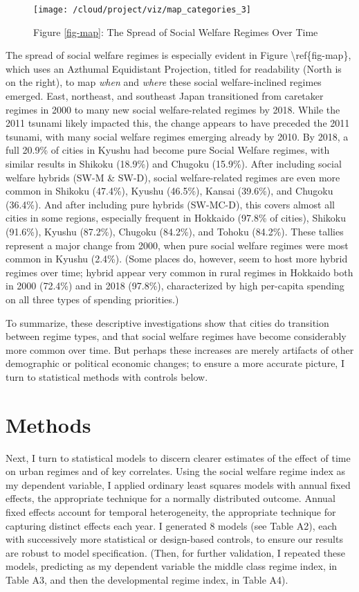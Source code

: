 \documentclass[preprint, 3p,
authoryear]{elsarticle} %
\begin{document}
\begin{figure}
\texttt{[image: /cloud/project/viz/map\_categories\_3]} \caption{Figure \ref{fig-map}\label{fig-map}: The Spread of Social Welfare Regimes Over Time}\label{fig:map}
\end{figure}

The spread of social welfare regimes is especially evident in Figure
\textbackslash ref\{fig-map\}, which uses an Azthumal Equidistant
Projection, titled for readability (North is on the right), to map
\emph{when} and \emph{where} these social welfare-inclined regimes
emerged. East, northeast, and southeast Japan transitioned from
caretaker regimes in 2000 to many new social welfare-related regimes by
2018. While the 2011 tsunami likely impacted this, the change appears to
have preceded the 2011 tsunami, with many social welfare regimes
emerging already by 2010. By 2018, a full 20.9\% of cities in Kyushu had
become pure Social Welfare regimes, with similar results in Shikoku
(18.9\%) and Chugoku (15.9\%). After including social welfare hybrids
(SW-M \& SW-D), social welfare-related regimes are even more common in
Shikoku (47.4\%), Kyushu (46.5\%), Kansai (39.6\%), and Chugoku
(36.4\%). And after including pure hybrids (SW-MC-D), this covers almost
all cities in some regions, especially frequent in Hokkaido (97.8\% of
cities), Shikoku (91.6\%), Kyushu (87.2\%), Chugoku (84.2\%), and Tohoku
(84.2\%). These tallies represent a major change from 2000, when pure
social welfare regimes were most common in Kyushu (2.4\%). (Some places
do, however, seem to host more hybrid regimes over time; hybrid appear
very common in rural regimes in Hokkaido both in 2000 (72.4\%) and in
2018 (97.8\%), characterized by high per-capita spending on all three
types of spending priorities.)

To summarize, these descriptive investigations show that cities do
transition between regime types, and that social welfare regimes have
become considerably more common over time. But perhaps these increases
are merely artifacts of other demographic or political economic changes;
to ensure a more accurate picture, I turn to statistical methods with
controls below.

\hypertarget{methods}{%
\section{Methods}\label{methods}}

Next, I turn to statistical models to discern clearer estimates of the
effect of time on urban regimes and of key correlates. Using the social
welfare regime index as my dependent variable, I applied ordinary least
squares models with annual fixed effects, the appropriate technique for
a normally distributed outcome. Annual fixed effects account for
temporal heterogeneity, the appropriate technique for capturing distinct
effects each year. I generated 8 models (see Table A2), each with
successively more statistical or design-based controls, to ensure our
results are robust to model specification. (Then, for further
validation, I repeated these models, predicting as my dependent variable
the middle class regime index, in Table A3, and then the developmental
regime index, in Table A4).
\end{document}
